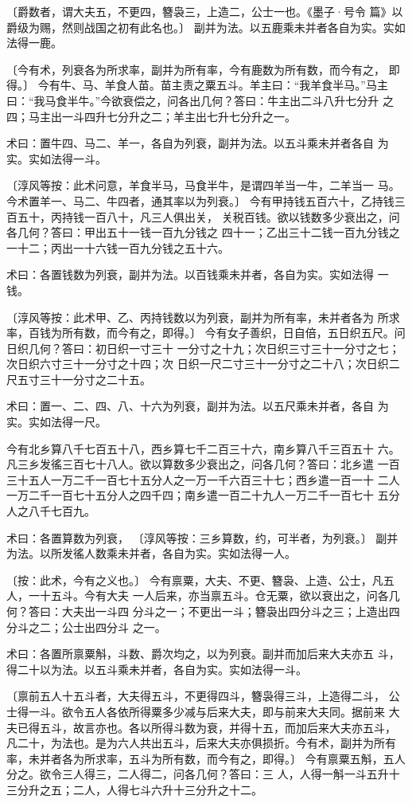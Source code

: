 \documentclass[a4paper,12pt,UTF8,twoside]{ctexbook}
\begin{document}
〔爵数者，谓大夫五，不更四，簪袅三，上造二，公士一也。《墨子·号令 篇》以爵级为赐，然则战国之初有此名也。〕 副并为法。以五鹿乘未并者各自为实。实如法得一鹿。

〔今有术，列衰各为所求率，副并为所有率，今有鹿数为所有数，而今有之， 即得。〕 今有牛、马、羊食人苗。苗主责之粟五斗。羊主曰：“我羊食半马。”马主 曰：“我马食半牛。”今欲衰偿之，问各出几何？答曰：牛主出二斗八升七分升 之四；马主出一斗四升七分升之二；羊主出七升七分升之一。

术曰：置牛四、马二、羊一，各自为列衰，副并为法。以五斗乘未并者各自 为实。实如法得一斗。

〔淳风等按：此术问意，羊食半马，马食半牛，是谓四羊当一牛，二羊当一 马。今术置羊一、马二、牛四者，通其率以为列衰。〕 今有甲持钱五百六十，乙持钱三百五十，丙持钱一百八十，凡三人俱出关， 关税百钱。欲以钱数多少衰出之，问各几何？答曰：甲出五十一钱一百九分钱之 四十一；乙出三十二钱一百九分钱之一十二；丙出一十六钱一百九分钱之五十六。

术曰：各置钱数为列衰，副并为法。以百钱乘未并者，各自为实。实如法得 一钱。

〔淳风等按：此术甲、乙、丙持钱数以为列衰，副并为所有率，未并者各为 所求率，百钱为所有数，而今有之，即得。〕 今有女子善织，日自倍，五日织五尺。问日织几何？答曰：初日织一寸三十 一分寸之十九；次日织三寸三十一分寸之七；次日织六寸三十一分寸之十四；次 日织一尺二寸三十一分寸之二十八；次日织二尺五寸三十一分寸之二十五。

术曰：置一、二、四、八、十六为列衰，副并为法。以五尺乘未并者，各自 为实。实如法得一尺。

今有北乡算八千七百五十八，西乡算七千二百三十六，南乡算八千三百五十 六。凡三乡发徭三百七十八人。欲以算数多少衰出之，问各几何？答曰：北乡遣 一百三十五人一万二千一百七十五分人之一万一千六百三十七；西乡遣一百一十 二人一万二千一百七十五分人之四千四；南乡遣一百二十九人一万二千一百七十 五分人之八千七百九。

术曰：各置算数为列衰， 〔淳风等按：三乡算数，约，可半者，为列衰。〕 副并为法。以所发徭人数乘未并者，各自为实。实如法得一人。

〔按：此术，今有之义也。〕 今有禀粟，大夫、不更、簪袅、上造、公士，凡五人，一十五斗。今有大夫 一人后来，亦当禀五斗。仓无粟，欲以衰出之，问各几何？答曰：大夫出一斗四 分斗之一；不更出一斗；簪袅出四分斗之三；上造出四分斗之二；公士出四分斗 之一。

术曰：各置所禀粟斛，斗数、爵次均之，以为列衰。副并而加后来大夫亦五 斗，得二十以为法。以五斗乘未并者，各自为实。实如法得一斗。

〔禀前五人十五斗者，大夫得五斗，不更得四斗，簪袅得三斗，上造得二斗， 公士得一斗。欲令五人各依所得粟多少减与后来大夫，即与前来大夫同。据前来 大夫已得五斗，故言亦也。各以所得斗数为衰，并得十五，而加后来大夫亦五斗， 凡二十，为法也。是为六人共出五斗，后来大夫亦俱损折。今有术，副并为所有 率，未并者各为所求率，五斗为所有数，而今有之，即得。〕 今有禀粟五斛，五人分之。欲令三人得三，二人得二，问各几何？答曰：三 人，人得一斛一斗五升十三分升之五；二人，人得七斗六升十三分升之十二。
\end{document}
